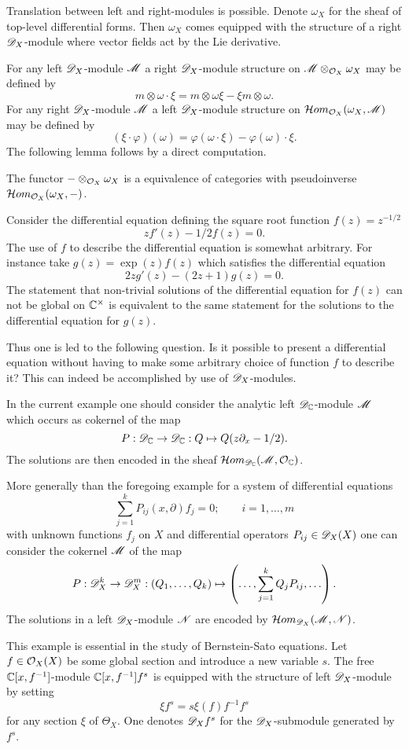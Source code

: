 Translation between left and right-modules is possible.
Denote $\omega_X$ for the sheaf of top-level differential forms.
Then $\omega_X$ comes equipped with the structure of a right $\mathscr{D}_X$-module where vector fields act by the Lie derivative.

For any left $\mathscr{D}_X$-module $\mathscr{M}$ a right $\mathscr{D}_X$-module structure on $\mathscr{M}\otimes_{\mathcal{O}_X}\omega_X$ may be defined by
$$m\otimes \omega \cdot \xi = m\otimes \omega\xi - \xi m \otimes \omega.$$
For any right $\mathscr{D}_X$-module $\mathscr{M}$ a left $\mathscr{D}_X$-module structure on $\mathcal{H}om_{\mathcal{O}_X}(\omega_X, \mathscr{M})$ may be defined by
$$(\xi\cdot \varphi)(\omega) = \varphi(\omega \cdot \xi) - \varphi(\omega)\cdot \xi. $$
The following lemma follows by a direct computation.
\begin{lemma}\label{lem: EquivalencLeftRight}
  The functor ${-}\otimes_{\mathcal{O}_X}\omega_X$ is a equivalence of categories with pseudoinverse  $\mathcal{H}om_{\mathcal{O}_X}(\omega_X,{-})$.
\end{lemma}
\begin{example}
  Consider the differential equation defining the square root function $f(z)= z^{-1/2}$
  $$zf'(z) -1/2f(z) = 0.$$
  The use of $f$ to describe the differential equation is somewhat arbitrary.
  For instance take $g(z) = \exp(z)f(z)$ which satisfies the differential equation
  $$2z g'(z) -(2z + 1)g(z) = 0.$$
  The statement that non-trivial solutions of the differential equation for $f(z)$ can not be global on $\mathbb{C}^\times$ is equivalent to the same statement for the solutions to the differential equation for $g(z)$.

  Thus one is led to the following question.
  Is it possible to present a differential equation without having to make some arbitrary choice of function $f$ to describe it?
  This can indeed be accomplished by use of $\mathscr{D}_X$-modules.

  In the current example one should consider the analytic left $\mathscr{D}_{\mathbb{C}}$-module $\mathscr{M}$ which occurs as cokernel of the map
  $$P:\mathscr{D}_{\mathbb{C}} \to \mathscr{D}_{\mathbb{C}}: Q \mapsto  Q(z\partial_x -1/2).$$
  The solutions are then encoded in the sheaf $\mathcal{H}om_{\mathscr{D}_{\mathbb{C}}}(\mathscr{M},\mathcal{O}_{\mathbb{C}})$.
\end{example}
\begin{remark}
  More generally than the foregoing example for a system of differential equations
  $$\sum_{j=1}^k P_{ij}(x,\partial) f_j = 0; \qquad i= 1,\ldots,m$$
  with unknown functions $f_j$ on $X$ and differential operators $P_{ij}\in \mathscr{D}_X(X)$
  one can consider the cokernel $\mathscr{M}$ of the map
  $$P:\mathscr{D}_X^k \to \mathscr{D}_X^m : \left(Q_1,\ldots, Q_k\right) \mapsto \left(\ldots, \sum_{j=1}^k Q_j P_{ij},\ldots\right).$$
  The solutions in a left $\mathscr{D}_X$-module $\mathscr{N}$ are encoded by $\mathcal{H}om_{\mathscr{D}_X}(\mathscr{M},\mathscr{N})$.
\end{remark}
\begin{example}\label{ex: fs}
  This example is essential in the study of Bernstein-Sato equations.
  Let $f\in \mathcal{O}_X(X)$ be some global section and introduce a new variable $s$.
  The free $\mathbb{C}[x,f^{-1}]$-module $\mathbb{C}[x,f^{-1}]f^s$ is equipped with the structure of left $\mathscr{D}_X$-module by setting
  $$\xi f^s = s \xi(f)f^{-1}f^{s}$$
  for any section $\xi$ of $\Theta_X$.
  One denotes $\mathscr{D}_Xf^s$ for the $\mathscr{D}_X$-submodule generated by $f^s$.
\end{example}
